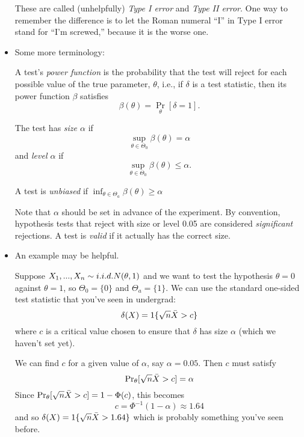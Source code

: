 \begin{itemize}[leftmargin=0pt]
  These are called (unhelpfully) \emph{Type I error} and \emph{Type II
  error}.  One way to remember the difference is to let the Roman
  numeral ``I'' in Type I error stand for ``I'm screwed,'' because it
  is the worse one.

\item Some more terminology:
  \begin{defn}
    A test's \emph{power function} is the probability that the test
    will reject for each possible value of the true parameter, $\theta$,
    i.e., if $\delta$ is a test statistic, then its power function $\beta$
    satisfies
    \begin{equation*}
      \beta(\theta) = \Pr_\theta[\delta = 1].
    \end{equation*}
    
    The test has \emph{size $\alpha$} if
    \begin{equation*}
      \sup_{\theta \in \Theta_0} \beta(\theta) = \alpha
    \end{equation*}
    and \emph{level $\alpha$} if
    \begin{equation*}
      \sup_{\theta \in \Theta_0} \beta(\theta) \leq \alpha.
    \end{equation*}

    A test is \emph{unbiased} if $\inf_{\theta \in \Theta_a} \beta(\theta) \geq \alpha$
  \end{defn}

  Note that $\alpha$ should be set in advance of the experiment.  By
  convention, hypothesis tests that reject with size or level 0.05 are
  considered \emph{significant} rejections.  A test is \emph{valid} if
  it actually has the correct size.

\item An example may be helpful.
  \begin{ex}
    Suppose $X_1,...,X_n \sim i.i.d. N(\theta,1)$ and we want to test the
    hypothesis $\theta = 0$ against $\theta = 1$, so $\Theta_0 = \{0\}$ and $\Theta_a =
    \{1\}$.  We can use the  standard one-sided test statistic that
    you've seen in undergrad:
    \begin{equation*}
      \delta(X) = \operatorname{1}\{\sqrt{n} \bar{X} > c\}
    \end{equation*}
    where $c$ is a critical value chosen to ensure that $\delta$ has size
    $\alpha$ (which we haven't set yet).

    We can find $c$ for a given value of $\alpha$, say $\alpha = 0.05$.  Then
    $c$ must satisfy
    \begin{equation*}
      \operatorname{Pr}_\theta[\sqrt{n} \bar{X} > c] = \alpha
    \end{equation*}
    Since $\operatorname{Pr}_\theta[\sqrt{n} \bar{X} > c] = 1 - \Phi(c)$, this becomes
    \begin{equation*}
      c = \Phi^{-1}(1 - \alpha) \approx 1.64
    \end{equation*}
    and so $\delta(X) = \operatorname{1}\{\sqrt{n} \bar{X} > 1.64\}$ which is probably
    something you've seen before.


\end{ex}
\end{itemize}
